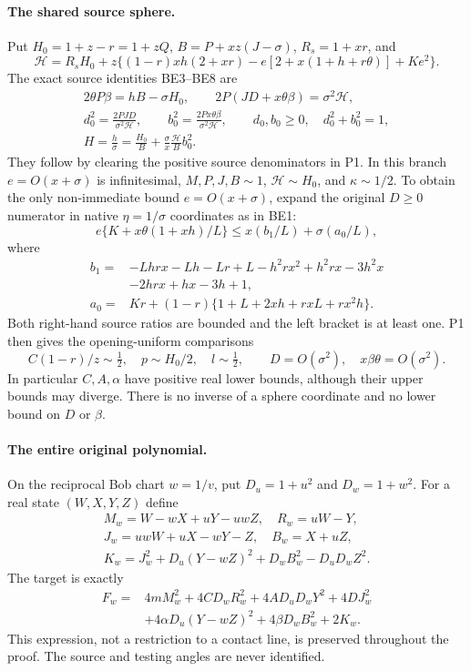 \paragraph{The shared source sphere.}
Put $H_0=1+z-r=1+zQ$,
$B=P+xz(J-\sigma)$, $R_s=1+xr$, and
\[
 \mathcal H=R_sH_0+z\{(1-r)xh(2+xr)
        -e[2+x(1+h+r\theta)]+Ke^2\}.
\]
The exact source identities BE3--BE8 are
\[
\begin{gathered}
 2\theta P\beta=hB-\sigma H_0,\qquad
 2P(JD+x\theta\beta)=\sigma^2\mathcal H,\\
 d_0^2=\frac{2PJD}{\sigma^2\mathcal H},\qquad
 b_0^2=\frac{2Px\theta\beta}{\sigma^2\mathcal H},\qquad
 d_0,b_0\ge0,\quad d_0^2+b_0^2=1,\\
 H=\frac h\sigma=\frac{H_0}{B}
       +\frac\sigma x\frac{\mathcal H}{B}b_0^2.
\end{gathered}                                                   \tag{P2}
\]
They follow by clearing the positive source denominators in P1.
In this branch $e=O(x+\sigma)$ is infinitesimal, $M,P,J,B\sim1$,
$\mathcal H\sim H_0$, and $\kappa\sim1/2$. To obtain the only
non-immediate bound $e=O(x+\sigma)$, expand the original $D\ge0$
numerator in native $\eta=1/\sigma$ coordinates as in BE1:
\[
 e\{K+x\theta(1+xh)/L\}
       \le x(b_1/L)+\sigma(a_0/L),
\]
where
\[
\begin{split}
 b_1={}&-Lhrx-Lh-Lr+L-h^2rx^2+h^2rx-3h^2x\\
       &-2hrx+hx-3h+1,\\
 a_0={}&Kr+(1-r)\{1+L+2xh+rxL+rx^2h\}.
\end{split}
\]
Both right-hand source ratios are bounded and the left bracket is
at least one. P1 then gives the opening-uniform comparisons
\[
 C(1-r)/z\sim\tfrac12,\quad p\sim H_0/2,\quad l\sim\tfrac12,
 \qquad D=O(\sigma^2),\quad x\beta\theta=O(\sigma^2).
                                                               \tag{P3}
\]
In particular $C,A,\alpha$ have positive real lower bounds,
although their upper bounds may diverge. There is no inverse of a
sphere coordinate and no lower bound on $D$ or $\beta$.

\paragraph{The entire original polynomial.}
On the reciprocal Bob chart $w=1/v$, put $D_u=1+u^2$ and
$D_w=1+w^2$. For a real state $(W,X,Y,Z)$ define
\[
\begin{gathered}
 M_w=W-wX+uY-uwZ,\quad R_w=uW-Y,\\
 J_w=uwW+uX-wY-Z,\quad B_w=X+uZ,\\
 K_w=J_w^2+D_u(Y-wZ)^2+D_wB_w^2-D_uD_wZ^2.
\end{gathered}
\]
The target is exactly
\[
\begin{split}
 F_w={}&4mM_w^2+4CD_wR_w^2+4AD_uD_wY^2+4DJ_w^2\\
       &+4\alpha D_u(Y-wZ)^2+4\beta D_wB_w^2+2K_w.
\end{split}                                                     \tag{P4}
\]
This expression, not a restriction to a contact line, is preserved
throughout the proof. The source and testing angles are never identified.

